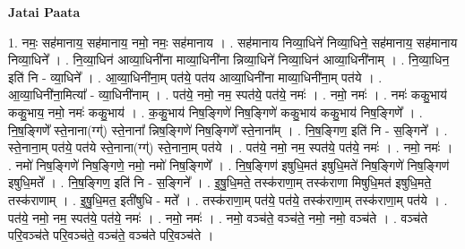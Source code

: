 \documentclass[17pt]{extarticle}
\begin{document}
\textbf{Jatai Paata} \newline

1. नमः॒ सह॑मानाय॒ सह॑मानाय॒ नमो॒ नमः॒ सह॑मानाय । . सह॑मानाय निव्या॒धिने॑ निव्या॒धिने॒ सह॑मानाय॒ सह॑मानाय निव्या॒धिने᳚ । . नि॒व्या॒धिन॑ आव्या॒धिनी॑ना माव्या॒धिनी॑ना न्निव्या॒धिने॑ निव्या॒धिन॑ आव्या॒धिनी॑नाम् । . नि॒व्या॒धिन॒ इति॑ नि - व्या॒धिने᳚ । . आ॒व्या॒धिनी॑ना॒म् पत॑ये॒ पत॑य आव्या॒धिनी॑ना माव्या॒धिनी॑ना॒म् पत॑ये । . आ॒व्या॒धिनी॑ना॒मित्या᳚ - व्या॒धिनी॑नाम् । . पत॑ये॒ नमो॒ नम॒ स्पत॑ये॒ पत॑ये॒ नमः॑ । . नमो॒ नमः॑ । . नमः॑ ककु॒भाय॑ ककु॒भाय॒ नमो॒ नमः॑ ककु॒भाय॑ । . क॒कु॒भाय॑ निष॒ङ्गिणे॑ निष॒ङ्गिणे॑ ककु॒भाय॑ ककु॒भाय॑ निष॒ङ्गिणे᳚ । . नि॒ष॒ङ्गिणे᳚ स्ते॒नाना(ग्ग्॑) स्ते॒नाना᳚ न्निष॒ङ्गिणे॑ निष॒ङ्गिणे᳚ स्ते॒नाना᳚म् । . नि॒ष॒ङ्गिण॒ इति॑ नि - स॒ङ्गिने᳚ । . स्ते॒नाना॒म् पत॑ये॒ पत॑ये स्ते॒नाना(ग्ग्॑) स्ते॒नाना॒म् पत॑ये । . पत॑ये॒ नमो॒ नम॒ स्पत॑ये॒ पत॑ये॒ नमः॑ । . नमो॒ नमः॑ । . नमो॑ निष॒ङ्गिणे॑ निष॒ङ्गिणे॒ नमो॒ नमो॑ निष॒ङ्गिणे᳚ । . नि॒ष॒ङ्गिण॑ इषुधि॒मत॑ इषुधि॒मते॑ निष॒ङ्गिणे॑ निष॒ङ्गिण॑ इषुधि॒मते᳚ । . नि॒ष॒ङ्गिण॒ इति॑ नि - स॒ङ्गिने᳚ । . इ॒षु॒धि॒मते॒ तस्क॑राणा॒म् तस्क॑राणा मिषुधि॒मत॑ इषुधि॒मते॒ तस्क॑राणाम् । . इ॒षु॒धि॒मत॒ इती॑षुधि - मते᳚ । . तस्क॑राणा॒म् पत॑ये॒ पत॑ये॒ तस्क॑राणा॒म् तस्क॑राणा॒म् पत॑ये । . पत॑ये॒ नमो॒ नम॒ स्पत॑ये॒ पत॑ये॒ नमः॑ । . नमो॒ नमः॑ । . नमो॒ वञ्च॑ते॒ वञ्च॑ते॒ नमो॒ नमो॒ वञ्च॑ते । . वञ्च॑ते परि॒वञ्च॑ते परि॒वञ्च॑ते॒ वञ्च॑ते॒ वञ्च॑ते परि॒वञ्च॑ते । \newline
\end{document}
